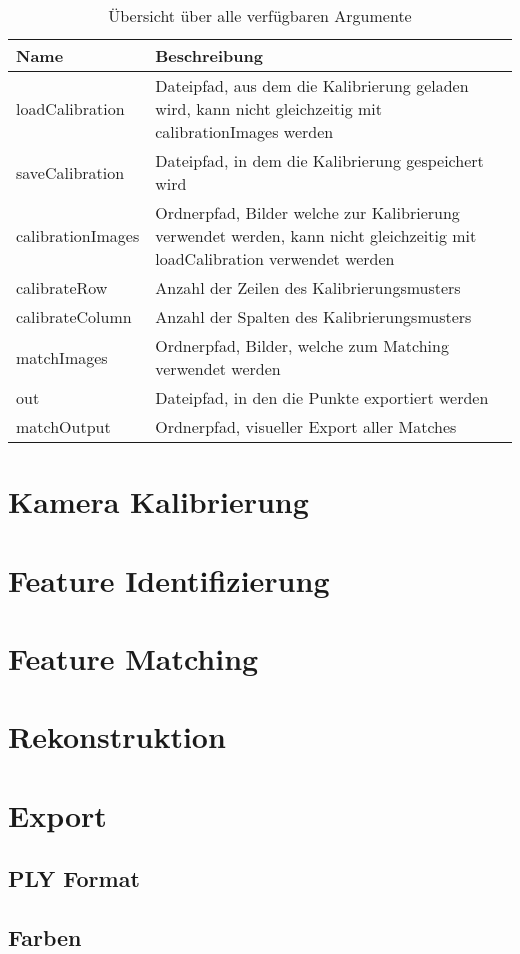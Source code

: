 \begin{table}[]
\centering
\begin{tabularx}{\textwidth}{ |l|X| }
\hline
Name              & Beschreibung                                                                                                              \\ \hline
loadCalibration   & Dateipfad, aus dem die Kalibrierung geladen wird, kann nicht gleichzeitig mit calibrationImages werden                    \\
saveCalibration   & Dateipfad, in dem die Kalibrierung gespeichert wird                                                                       \\
calibrationImages & Ordnerpfad, Bilder welche zur Kalibrierung verwendet werden, kann nicht gleichzeitig mit loadCalibration verwendet werden \\
calibrateRow      & Anzahl der Zeilen des Kalibrierungsmusters                                                                                \\
calibrateColumn   & Anzahl der Spalten des Kalibrierungsmusters                                                                               \\
matchImages       & Ordnerpfad, Bilder, welche zum Matching verwendet werden                                                                  \\
out               & Dateipfad, in den die Punkte exportiert werden                                                                            \\
matchOutput       & Ordnerpfad, visueller Export aller Matches                                                                                \\ \hline
\end{tabularx}
\caption{Übersicht über alle verfügbaren Argumente}
\label{tab:arguments}
\end{table}

\section{Kamera Kalibrierung}

\section{Feature Identifizierung}

\section{Feature Matching}

\section{Rekonstruktion}

\section{Export}
\subsection{PLY Format}
\subsection{Farben}